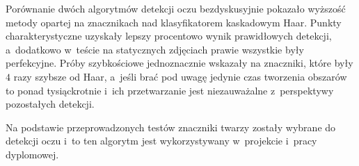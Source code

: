 Porównanie dwóch algorytmów detekcji oczu bezdyskusyjnie pokazało wyższość metody opartej na znacznikach nad klasyfikatorem kaskadowym Haar. Punkty charakterystyczne uzyskały lepszy procentowo wynik prawidłowych detekcji, a~dodatkowo w~teście na statycznych zdjęciach prawie wszystkie były perfekcyjne. Próby szybkościowe jednoznacznie wskazały na znaczniki, które były $4$ razy szybsze od Haar, a~jeśli brać pod uwagę jedynie czas tworzenia obszarów to ponad tysiąckrotnie i~ich przetwarzanie jest niezauważalne z~perspektywy pozostałych detekcji.

\vspace{5mm}

Na podstawie przeprowadzonych testów znaczniki twarzy zostały wybrane do detekcji oczu i~to ten algorytm jest wykorzystywany w~projekcie i~pracy dyplomowej.